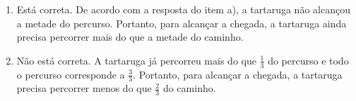 \documentclass[10 pt,usenames,dvipsnames, oneside]{article}
\begin{document}
\begin{solucao}
\begin{enumerate}
\item     Está correta. De acordo com a resposta do item a), a tartaruga não alcançou a metade do percurso. Portanto, para alcançar a chegada, a tartaruga ainda precisa percorrer mais do que a metade do caminho.

\item     Não está correta. A tartaruga já percorreu mais do que      $\frac{1}{3}$     do percurso e todo o percurso corresponde a      $\frac{3}{3}$. Portanto, para alcançar a chegada, a tartaruga precisa percorrer menos do que     $\frac{2}{3}$     do caminho.
\end{enumerate}

\end{solucao}
\fi
\end{document}
